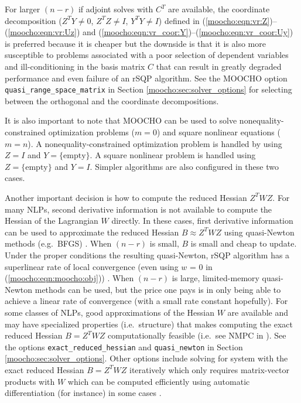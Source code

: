 \documentclass[pdf,ps2pdf,11pt]{SANDreport}
\begin{document}
For larger $(n-r)$ if adjoint solves with $C^T$ are available, the coordinate
decomposition ($Z^T Y {}\neq 0$, $Z^T Z {}\neq I$, $Y^T Y \neq I$) defined in
(\ref{moocho:eqn:vr:Z})--(\ref{moocho:eqn:vr:Uz}) and
(\ref{moocho:eqn:vr_coor:Y})--(\ref{moocho:eqn:vr_coor:Uy}) is preferred
because it is cheaper but the downside is that it is also more susceptible to
problems associated with a poor selection of dependent variables and
ill-conditioning in the basis matrix $C$ that can result in greatly degraded
performance and even failure of an rSQP algorithm.  See the MOOCHO option
{}\texttt{quasi\-\_range\-\_space\-\_matrix} in Section
{}\ref{moocho:sec:solver_options} for selecting between the orthogonal and the
coordinate decompositions.

It is also important to note that MOOCHO can be used to solve
nonequality-constrained optimization problems ($m=0$) and square nonlinear
equations ($m=n$).  A nonequality-constrained optimization problem is handled
by using $Z=I$ and $Y=\{\mbox{empty}\}$.  A square nonlinear problem is
handled using $Z=\{\mbox{empty}\}$ and $Y=I$.  Simpler algorithms are also
configured in these two cases.

Another important decision is how to compute the reduced Hessian $Z^T W Z$.
For many NLPs, second derivative information is not available to compute the
Hessian of the Lagrangian $W$ directly.  In these cases, first derivative
information can be used to approximate the reduced Hessian $B {}\approx Z^T W
Z$ using quasi-Newton methods (e.g.\ BFGS) {}\cite{ref:nocedal_overton_1985}.
When $(n-r)$ is small, $B$ is small and cheap to update.  Under the proper
conditions the resulting quasi-Newton, rSQP algorithm has a superlinear rate
of local convergence (even using $w$ = 0 in (\ref{moocho:eqn:moocho:obj}))
{}\cite{ref:biegler_et_al_1995}.  When $(n-r)$ is large, limited-memory
quasi-Newton methods can be used, but the price one pays is in only being able
to achieve a linear rate of convergence (with a small rate constant
hopefully).  For some classes of NLPs, good approximations of the Hessian $W$
are available and may have specialized properties (i.e.\ structure) that makes
computing the exact reduced Hessian $B = Z^T W Z$ computationally feasible
(i.e.\ see NMPC in {}\cite{RABartlett_2001}).  See the options
{}\texttt{exact\_reduced\_hessian} and {}\texttt{quasi\_newton} in Section
{}\ref{moocho:sec:solver_options}.  Other options include solving for
system with the exact reduced Hessian $B = Z^T W Z$ iteratively which
only requires matrix-vector products with $W$ which can be computed
efficiently using automatic differentiation (for instance) in some
cases {}\cite{ref:adolc_1996}.
\end{document}
